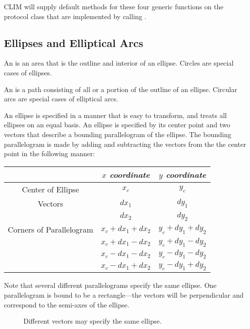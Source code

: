 CLIM will supply default methods for these four generic functions on the
protocol class  that are implemented by calling
.


\subsection {Ellipses and Elliptical Arcs}

An  is an area that is the outline and interior of an ellipse.
Circles are special cases of ellipses.

An  is a path consisting of all or a portion of the
outline of an ellipse.  Circular arcs are special cases of elliptical arcs.

An ellipse is specified in a manner that is easy to transform, and treats all
ellipses on an equal basis.  An ellipse is specified by its center point and two
vectors that describe a bounding parallelogram of the ellipse.  The bounding
parallelogram is made by adding and subtracting the vectors from the the center
point in the following manner:

\begin{tabular}{|c|cc|}
 \hline
   & {\sl $x$ coordinate} & {\sl $y$ coordinate} \\
 \hline
 Center of Ellipse & $x_c$ & $y_c$ \\
 \hline
 Vectors & $dx_1$ & $dy_1$ \\
         & $dx_2$ & $dy_2$ \\
 \hline
 Corners of Parallelogram & $x_c + dx_1 + dx_2$ & $y_c + dy_1 + dy_2$ \\
                          & $x_c + dx_1 - dx_2$ & $y_c + dy_1 - dy_2$ \\
                          & $x_c - dx_1 - dx_2$ & $y_c - dy_1 - dy_2$ \\
                          & $x_c - dx_1 + dx_2$ & $y_c - dy_1 + dy_2$ \\
 \hline
\end{tabular}

Note that several different parallelograms specify the same ellipse.  One
parallelogram is bound to be a rectangle---the vectors will be perpendicular
and correspond to the semi-axes of the ellipse.

\begin{figure}
\ifpsfig\centerline{}\else\vspace{1.5in}\fi
\caption{Different vectors may specify the same ellipse.}
\end{figure}

